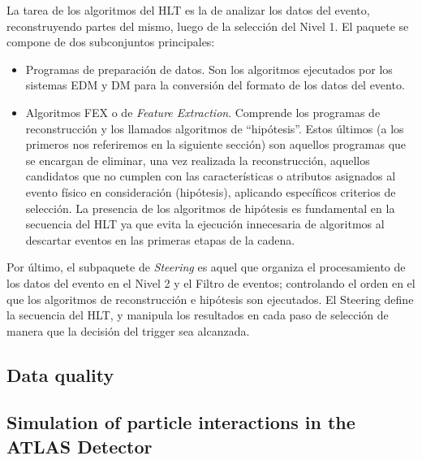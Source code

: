   La tarea de los algoritmos del HLT es la de analizar los datos del evento, reconstruyendo partes del mismo, luego de la selecci\'on del Nivel 1. El paquete se compone de dos subconjuntos principales:
\begin{itemize}
   \item Programas de preparaci\'on de datos. Son los algoritmos ejecutados por los sistemas EDM y DM para la conversi\'on del formato de los datos del evento. 
   \item Algoritmos FEX o de \emph{Feature Extraction}. Comprende los programas de reconstrucci\'on y los llamados algoritmos de ``hip\'otesis''. Estos \'ultimos (a los primeros nos referiremos en la siguiente secci\'on) son aquellos programas que se encargan de eliminar, una vez realizada la reconstrucci\'on, aquellos candidatos que no cumplen con las caracter\'isticas o atributos asignados al evento f\'isico en consideraci\'on (hip\'otesis), aplicando espec\'ificos criterios de selecci\'on. La presencia de los algoritmos de hip\'otesis es fundamental en la secuencia del HLT ya que evita la ejecuci\'on innecesaria de algoritmos al descartar eventos en las primeras etapas de la cadena.
\end{itemize}

  Por \'ultimo, el subpaquete de \emph{Steering} es aquel que organiza el procesamiento de los datos del evento en el Nivel 2 y el Filtro de eventos; controlando el orden en el que los algoritmos de reconstrucci\'on e hip\'otesis son ejecutados. El Steering define la secuencia del HLT, y manipula los resultados en cada paso de selecci\'on de manera que la decisi\'on del trigger sea alcanzada.


\subsection{Data quality}\label{sec:atlasSim}

\subsection{Simulation of particle interactions in the ATLAS Detector}\label{sec:atlasSim}



